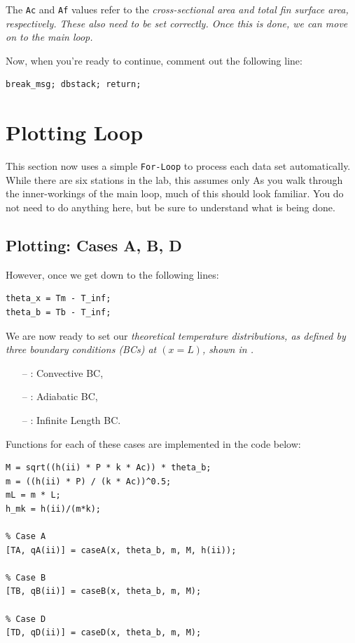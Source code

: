 \documentclass[11pt, letterpaper]{article}
\begin{document}
\n
{} The \texttt{Ac} and \texttt{Af} values refer to the \it{cross-sectional area} and \it{total fin surface area}, respectively. These also need to be set correctly. Once this is done, we can move on to the main loop.

\n
Now, when you're ready to continue, comment out the following line:

\n
\begin{lstlisting}[numbers=none]
% remove break
break_msg; dbstack; return;
\end{lstlisting}


\section{Plotting Loop}

This section now uses a simple \texttt{For-Loop} to process each data set automatically. While there are six stations in the lab, this assumes only 
\n
As you walk through the inner-workings of the main loop, much of this should look familiar. You do not need to do anything here, but be sure to understand what is being done.

\n
\subsection{Plotting: Cases A, B, D}

However, once we get down to the following lines:
\n
\begin{lstlisting}[numbers=none]
% The fin excess temperatures
theta_x = Tm - T_inf;
theta_b = Tb - T_inf;
\end{lstlisting}

We are now ready to set our \it{theoretical} temperature distributions, as defined by three boundary conditions (BCs) at $(x=L)$, shown in .

\begin{itemize}
    \item [--] : Convective BC,
    \item [--] : Adiabatic BC,
    \item [--] : Infinite Length BC.
\end{itemize} 

Functions for each of these cases are implemented in the code below:
\n
\begin{lstlisting}[numbers=none]
% m & M
M = sqrt((h(ii) * P * k * Ac)) * theta_b;
m = ((h(ii) * P) / (k * Ac))^0.5;
mL = m * L;
h_mk = h(ii)/(m*k);

% Case A
[TA, qA(ii)] = caseA(x, theta_b, m, M, h(ii));

% Case B
[TB, qB(ii)] = caseB(x, theta_b, m, M);

% Case D
[TD, qD(ii)] = caseD(x, theta_b, m, M);
\end{lstlisting}
\end{document}
